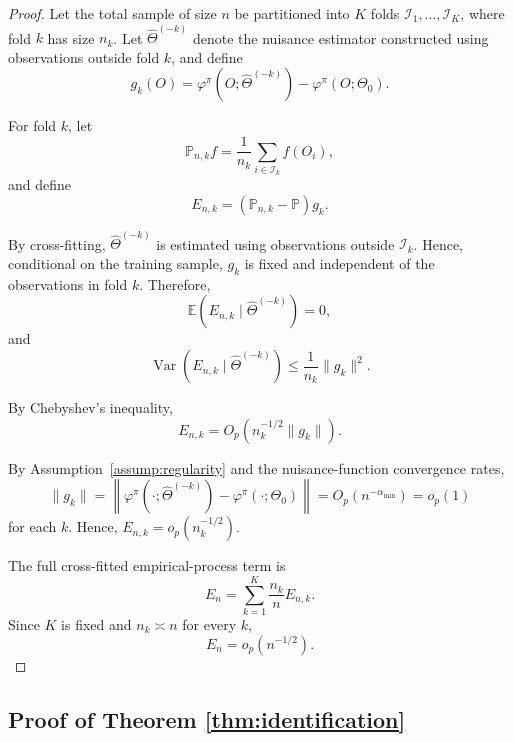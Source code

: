 \documentclass[12pt]{article}
\newcommand{\0}{\boldsymbol{0}}
\begin{document}
\begin{proof}
Let the total sample of size $n$ be partitioned into $K$ folds $\mathcal{I}_1,\ldots,\mathcal{I}_K$, where fold $k$ has size $n_k$. Let $\widehat{\Theta}^{(-k)}$ denote the nuisance estimator constructed using observations outside fold $k$, and define
\[
g_k(O)=\varphi^\pi\!\left(O;\widehat{\Theta}^{(-k)}\right)-\varphi^\pi(O;\Theta_0).
\]

For fold $k$, let
\[
\mathbb{P}_{n,k}f=\frac{1}{n_k}\sum_{i\in\mathcal{I}_k} f(O_i),
\]
and define
\[
E_{n,k}=(\mathbb{P}_{n,k}-\mathbb{P})g_k.
\]

By cross-fitting, $\widehat{\Theta}^{(-k)}$ is estimated using observations outside $\mathcal{I}_k$. Hence, conditional on the training sample, $g_k$ is fixed and independent of the observations in fold $k$.
Therefore,
\[
\mathbb{E}\left(E_{n,k}\mid\widehat{\Theta}^{(-k)}\right)=0,
\]
and
\[
\operatorname{Var}\left(E_{n,k}\mid\widehat{\Theta}^{(-k)}\right)
\leq\frac{1}{n_k}\|g_k\|^2.
\]

By Chebyshev's inequality,
\[
E_{n,k}=O_p\left(n_k^{-1/2}\|g_k\|\right).
\]

By Assumption~\ref{assump:regularity} and the nuisance-function convergence rates,
\[
\|g_k\|=\left\|\varphi^\pi\left(\cdot;\widehat{\Theta}^{(-k)}\right)
-\varphi^\pi(\cdot;\Theta_0)\right\|=O_p\left(n^{-\alpha_{\min}}\right)=o_p(1)
\]
for each $k$. Hence,
\(E_{n,k}=o_p(n_k^{-1/2}).\)

The full cross-fitted empirical-process term is
\[
E_n=\sum_{k=1}^K\frac{n_k}{n}E_{n,k}.
\]
Since $K$ is fixed and $n_k\asymp n$ for every $k$,
\[
E_n=o_p(n^{-1/2}).
\]
\end{proof}



\subsection{Proof of Theorem \ref{thm:identification}}
\end{document}
